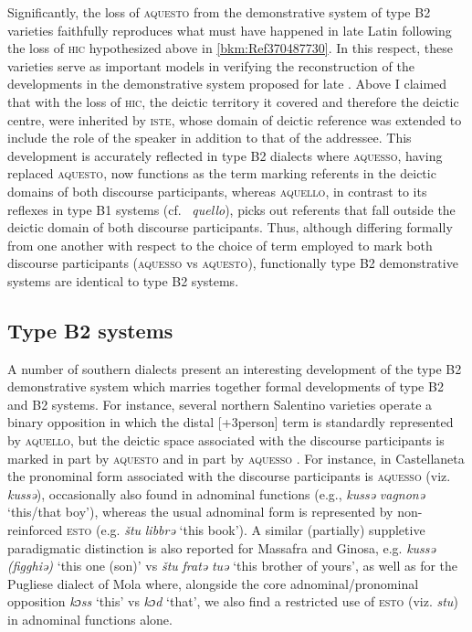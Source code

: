 \documentclass[output=paper]{langsci/langscibook}
\begin{document}
Significantly, the loss of \textsc{aquesto} from the demonstrative system of
type B2 varieties faithfully reproduces what must have happened in late
Latin following the loss of \textsc{hic} hypothesized above in
\cref{bkm:Ref370487730}. In this respect, these varieties serve as important
models in verifying the reconstruction of the developments in the demonstrative
system proposed for late . Above I claimed that with the loss of
\textsc{hic}, the deictic territory it covered and therefore the deictic
centre, were inherited by \textsc{iste}, whose domain of deictic reference was
extended to include the role of the speaker in addition to that of the
addressee. This development is accurately reflected in type B2 dialects
where \textsc{aquesso}, having replaced \textsc{aquesto}, now functions as the
term marking referents in the deictic domains of both discourse participants,
whereas \textsc{aquello}, in contrast to its reflexes in type B1 systems
(cf.\  \emph{quello}), picks out referents that fall outside the deictic
domain of both discourse participants. Thus, although differing formally from
one another with respect to the choice of term employed to mark both discourse
participants (\textsc{aquesso} vs \textsc{aquesto}), functionally type
B2 demonstrative systems are identical to type B2 systems.

\subsection{Type B2 systems}

A number of southern  dialects present an interesting development
of the type B2 demonstrative system which marries together
formal developments of type B2 and B2 systems. For instance,
several northern Salentino varieties operate a binary opposition in which the
distal [+3person] term is standardly represented by \textsc{aquello}, but the
deictic space associated with the discourse participants is marked in part by
\textsc{aquesto} and in part by \textsc{aquesso} \citep[157]{Mancarella:1998a}.
For instance, in Castellaneta the pronominal form associated with the discourse
participants is \textsc{aquesso} (viz. \emph{kussə}), occasionally also found
in adnominal functions (e.g., \emph{kussə} \emph{vagnonə} ‘this/that boy’),
whereas the usual adnominal form is represented by non-reinforced \textsc{esto}
(e.g. \emph{štu} \emph{libbrə} ‘this book’). A similar (partially) suppletive
paradigmatic distinction is also reported for Massafra and Ginosa, e.g.
\emph{kussə} \emph{(figghiə)} ‘this one (son)’ vs \emph{štu} \emph{fratə}
\emph{tuə} ‘this brother of yours’, as well as for the Pugliese dialect of Mola
\citep[62f]{Cox-Mildare:2001a} where, alongside the core adnominal/pronominal
opposition \emph{kɔss} ‘this’ vs \emph{kɔd} ‘that’, we also find a restricted
use of \textsc{esto} (viz. \emph{stu}) in adnominal functions alone.
\end{document}
